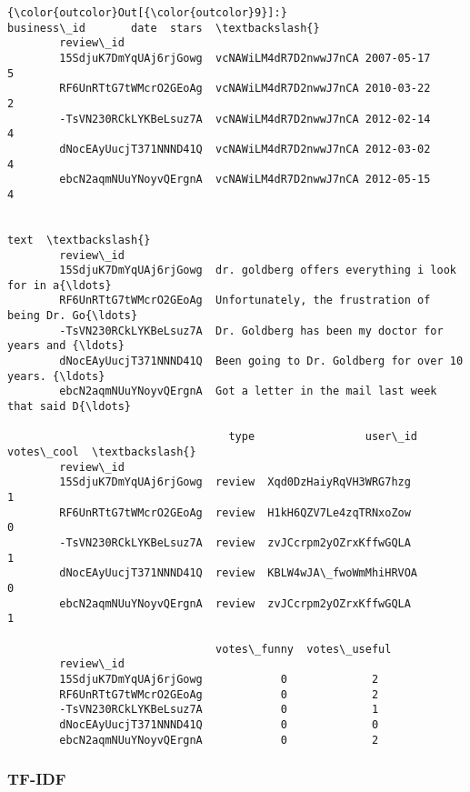 \documentclass[11pt]{article}
\begin{document}
\begin{Verbatim}[commandchars=\\\{\}]
{\color{outcolor}Out[{\color{outcolor}9}]:}                                    business\_id       date  stars  \textbackslash{}
        review\_id                                                          
        15SdjuK7DmYqUAj6rjGowg  vcNAWiLM4dR7D2nwwJ7nCA 2007-05-17      5   
        RF6UnRTtG7tWMcrO2GEoAg  vcNAWiLM4dR7D2nwwJ7nCA 2010-03-22      2   
        -TsVN230RCkLYKBeLsuz7A  vcNAWiLM4dR7D2nwwJ7nCA 2012-02-14      4   
        dNocEAyUucjT371NNND41Q  vcNAWiLM4dR7D2nwwJ7nCA 2012-03-02      4   
        ebcN2aqmNUuYNoyvQErgnA  vcNAWiLM4dR7D2nwwJ7nCA 2012-05-15      4   
        
                                                                             text  \textbackslash{}
        review\_id                                                                   
        15SdjuK7DmYqUAj6rjGowg  dr. goldberg offers everything i look for in a{\ldots}   
        RF6UnRTtG7tWMcrO2GEoAg  Unfortunately, the frustration of being Dr. Go{\ldots}   
        -TsVN230RCkLYKBeLsuz7A  Dr. Goldberg has been my doctor for years and {\ldots}   
        dNocEAyUucjT371NNND41Q  Been going to Dr. Goldberg for over 10 years. {\ldots}   
        ebcN2aqmNUuYNoyvQErgnA  Got a letter in the mail last week that said D{\ldots}   
        
                                  type                 user\_id  votes\_cool  \textbackslash{}
        review\_id                                                            
        15SdjuK7DmYqUAj6rjGowg  review  Xqd0DzHaiyRqVH3WRG7hzg           1   
        RF6UnRTtG7tWMcrO2GEoAg  review  H1kH6QZV7Le4zqTRNxoZow           0   
        -TsVN230RCkLYKBeLsuz7A  review  zvJCcrpm2yOZrxKffwGQLA           1   
        dNocEAyUucjT371NNND41Q  review  KBLW4wJA\_fwoWmMhiHRVOA           0   
        ebcN2aqmNUuYNoyvQErgnA  review  zvJCcrpm2yOZrxKffwGQLA           1   
        
                                votes\_funny  votes\_useful  
        review\_id                                          
        15SdjuK7DmYqUAj6rjGowg            0             2  
        RF6UnRTtG7tWMcrO2GEoAg            0             2  
        -TsVN230RCkLYKBeLsuz7A            0             1  
        dNocEAyUucjT371NNND41Q            0             0  
        ebcN2aqmNUuYNoyvQErgnA            0             2  
\end{Verbatim}
            
    \hypertarget{tf-idf}{%
\subsubsection{TF-IDF}\label{tf-idf}}
\end{document}
